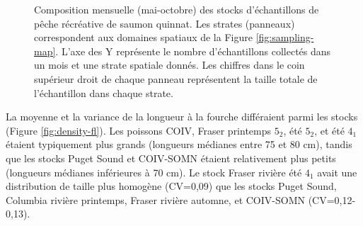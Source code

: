 \begin{figure}[H]
    \centering
    \caption{Composition mensuelle (mai-octobre) des stocks d'échantillons de pêche récréative de saumon quinnat. Les strates (panneaux) correspondent aux domaines spatiaux de la Figure \ref{fig:sampling-map}. L'axe des Y représente le nombre d'échantillons collectés dans un mois et une strate spatiale donnés. Les chiffres dans le coin supérieur droit de chaque panneau représentent la taille totale de l'échantillon dans chaque strate.}
    \label{fig:bar-rec-summer}
\end{figure}

La moyenne et la variance de la longueur à la fourche différaient parmi les stocks (Figure \ref{fig:density-fl}). Les poissons COIV, Fraser printemps $5_2$, été $5_2$, et été $4_1$ étaient typiquement plus grands (longueurs médianes entre 75 et 80 cm), tandis que les stocks Puget Sound et COIV-SOMN étaient relativement plus petits (longueurs médianes inférieures à 70 cm). Le stock Fraser rivière été $4_1$ avait une distribution de taille plus homogène (CV=0,09) que les stocks Puget Sound, Columbia rivière printemps, Fraser rivière automne, et COIV-SOMN (CV=0,12-0,13).

